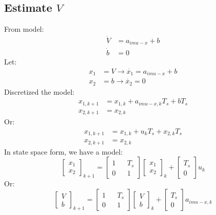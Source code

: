 	\subsection{Estimate \(V\)}
	From model:
	\begin{equation}
		\begin{split}
			\dot{V} &= a_{imu-x} + b \\
			\dot{b} &= 0
		\end{split}
		\label{sensorfuseq8}
	\end{equation}
	Let:
	\[\begin{split}
		x_1 &= V \rightarrow \dot{x_1} = a_{imu-x} + b \\
		x_2 &= b \rightarrow \dot{x_2} = 0
	\end{split}\]
	Discretized the model:
	\[\begin{split}
		x_{1,k+1} &= x_{1,k} + a_{imu-x,k}T_s + bT_s \\
		x_{2,k+1} &= x_{2,k}
	\end{split}\]
	Or:
	\[\begin{split}
		x_{1,k+1} &= x_{1,k} + u_kT_s + x_{2,k}T_s \\
		x_{2,k+1} &= x_{2,k}
	\end{split}\]
	In state space form, we have a model:
	\begin{equation}
		\boxed{
			\begin{bmatrix}
				x_1 \\
				x_2 
			\end{bmatrix}_{k+1} = 
			\begin{bmatrix}
				1 &   & T_s \\
				0 &   & 1   
			\end{bmatrix}
			\begin{bmatrix}
				x_1 \\
				x_2 
			\end{bmatrix}_k +
			\begin{bmatrix}
				T_s \\
				0   
			\end{bmatrix} u_k
		}
		\label{sensorfuseq9}
	\end{equation}
	Or:
	\begin{equation}
		\boxed{
			\begin{bmatrix}
				V \\
				b 
			\end{bmatrix}_{k+1} = 
			\begin{bmatrix}
				1 &   & T_s \\
				0 &   & 1   
			\end{bmatrix}
			\begin{bmatrix}
				V \\
				b 
			\end{bmatrix}_k +
			\begin{bmatrix}
				T_s \\
				0   
			\end{bmatrix} a_{imu-x,k}
		}
		\label{sensorfuseq10}
	\end{equation}
